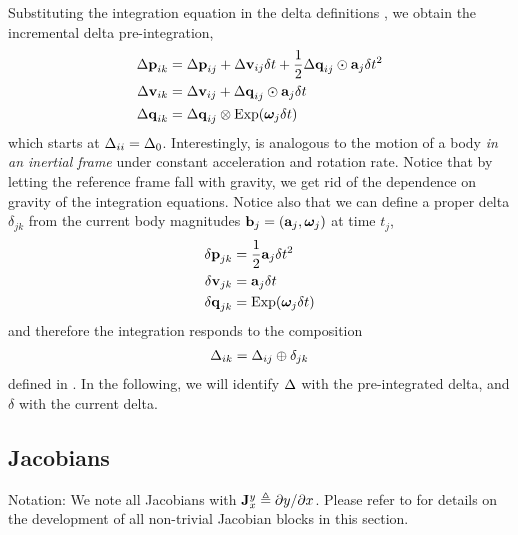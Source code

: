 Substituting the integration equation  in the delta definitions , we obtain the incremental delta pre-integration,
%
\begin{align}\label{equ:g_second_order_pre-integration}
\begin{split}
{\Delta{\bf p}}_{ik} 
&= {\Delta{\bf p}}_{ij} + {\Delta{\bf v}}_{ij}\delta t + \frac12{\Delta{\bf q}}_{ij}\odot{\bf a}_j\delta t^2 \\
{\Delta{\bf v}}_{ik} 
&= {\Delta{\bf v}}_{ij} + {\Delta{\bf q}}_{ij}\odot{\bf a}_j\delta t \\
{\Delta{\bf q}}_{ik} 
&= {\Delta{\bf q}}_{ij}\otimes\operatorname*{Exp}({{\bm \omega}}_j\delta t) 
\end{split}
\end{align}
%
which starts at $\Delta_{ii}=\Delta_0$. Interestingly,  is analogous to the motion of a body \emph{in an inertial frame} under constant acceleration and rotation rate.
Notice that by letting the reference frame fall with gravity, we get rid of the dependence on gravity of the integration equations.
Notice also that we can define a proper delta $\delta_{jk}$ from the current body magnitudes ${\bf b}_j=({\bf a}_j,{{\bm \omega}}_j)$ at time $t_j$,
%
\begin{align}\label{equ:delta_creation}
\begin{split}
{\delta{\bf p}}_{jk} &= \frac12{\bf a}_j\delta t^2 \\
{\delta{\bf v}}_{jk} &= {\bf a}_j\delta t \\
{\delta{\bf q}}_{jk} &= \operatorname*{Exp}({{\bm \omega}}_j\delta t)
\end{split}
\end{align}
%
and therefore the integration  responds to the composition 
%
\begin{align}\label{equ:composition_compact}
\Delta_{ik}=\Delta_{ij}\oplus\delta_{jk}
\end{align}
%
defined in . In the following, we will identify $\Delta$ with the pre-integrated delta, and $\delta$ with the current delta.


\subsection{Jacobians}

\newcommand{\jac}[2]{{\bfJ^{#1}_{#2}}}

Notation: 
We note all Jacobians with $\jac{y}{x}\te\dparil{y}{x}$. 
Please refer to  for details on the development of all non-trivial Jacobian blocks in this section.



